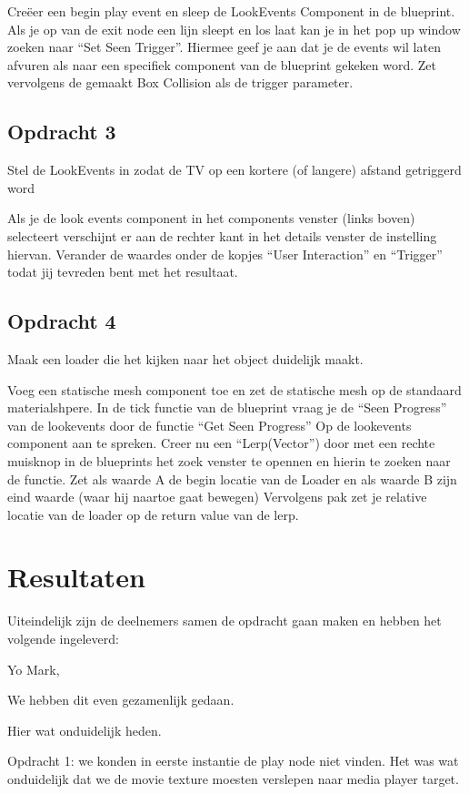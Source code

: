 Creëer een begin play event en sleep de LookEvents Component in de blueprint. Als je op van de exit node een lijn sleept en los laat kan je in het pop up window zoeken naar “Set Seen Trigger”. Hiermee geef je aan dat je de events wil laten afvuren als naar een specifiek component van de blueprint gekeken word. Zet vervolgens de gemaakt Box Collision als de trigger parameter.

\subsection{Opdracht 3}
Stel de LookEvents in zodat de TV op een kortere (of langere) afstand getriggerd word

Als je de look events component in het components venster (links boven) selecteert verschijnt er aan de rechter kant in het details venster de instelling hiervan. 
Verander de waardes onder de kopjes “User Interaction” en “Trigger” todat jij tevreden bent met het resultaat.

\subsection{Opdracht 4}
Maak een loader die het kijken naar het object duidelijk maakt.

Voeg een statische mesh component toe en zet de statische mesh op de standaard materialshpere.
In de tick functie van de blueprint vraag je de “Seen Progress” van de lookevents door de functie “Get Seen Progress” Op de lookevents component aan te spreken.
Creer nu een “Lerp(Vector”) door met een rechte muisknop in de blueprints het zoek venster te opennen en hierin te zoeken naar de functie.
Zet als waarde A de begin locatie van de Loader en als waarde B zijn eind waarde (waar hij naartoe gaat bewegen)
Vervolgens pak zet je relative locatie  van de loader op de return value van de lerp.

\section{Resultaten}
Uiteindelijk zijn de deelnemers samen de opdracht gaan maken en hebben het volgende ingeleverd:

Yo Mark,

We hebben dit even gezamenlijk gedaan. 

Hier wat onduidelijk heden.

Opdracht 1: we konden in eerste instantie de play node niet vinden.
Het was wat onduidelijk dat we de movie texture moesten verslepen naar media player target.

